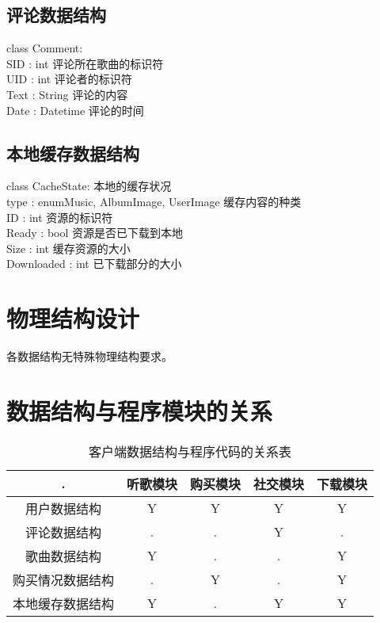 \subsection{评论数据结构}

class Comment:\\
\indent \indent    SID : int           评论所在歌曲的标识符\\
\indent \indent    UID : int           评论者的标识符\\
\indent \indent    Text : String       评论的内容\\
\indent \indent    Date : Datetime     评论的时间

\subsection{本地缓存数据结构}

class CacheState:       本地的缓存状况\\
\indent \indent    type : enum{Music, AlbumImage, UserImage}
\indent \indent                        缓存内容的种类\\
\indent \indent    ID : int            资源的标识符\\
\indent \indent    Ready : bool        资源是否已下载到本地\\
\indent \indent    Size : int          缓存资源的大小\\
\indent \indent    Downloaded : int    已下载部分的大小

\section{物理结构设计}
各数据结构无特殊物理结构要求。

\section{数据结构与程序模块的关系}
\begin{table}[htbp]
\centering
\caption{客户端数据结构与程序代码的关系表} \label{tab:datastructure-module}
\begin{tabular}{|c|c|c|c|c|}
    \hline
    . & 听歌模块 & 购买模块 & 社交模块 & 下载模块 \\
    \hline
    用户数据结构 & Y & Y & Y & Y \\
    \hline
    评论数据结构 & . & . & Y & . \\
    \hline
    歌曲数据结构 & Y & . & . & Y \\
    \hline
    购买情况数据结构 & . & Y & . & Y \\
    \hline
    本地缓存数据结构 & Y & . & Y & Y \\
    \hline
\end{tabular}
\end{table}

